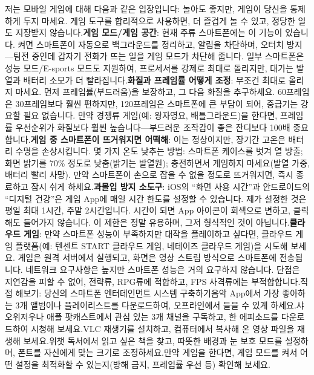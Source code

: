 저는 모바일 게임에 대해 다음과 같은 입장입니다: 놀아도 좋지만, 게임이 당신을 통제하게 두지 마세요. 게임 도구를 합리적으로 사용하면, 더 즐겁게 놀 수 있고, 정당한 일도 지장받지 않습니다.\textbf{게임 모드/게임 공간}: 현재 주류 스마트폰에는 이 기능이 있습니다. 켜면 스마트폰이 자동으로 백그라운드를 정리하고, 알림을 차단하며, 오터치 방지—팀전 중인데 갑자기 전화가 뜨는 일을 게임 모드가 차단해 줍니다. 일부 스마트폰은 성능 모드/E-sports 모드도 지원하여, 프로세서를 강제로 최대로 돌리지만, 대가는 발열과 배터리 소모가 더 빨라집니다.\textbf{화질과 프레임률 어떻게 조정}: 무조건 최대로 올리지 마세요. 먼저 프레임률(부드러움)을 보장하고, 그 다음 화질을 추구하세요. 60프레임은 30프레임보다 훨씬 편하지만, 120프레임은 스마트폰에 큰 부담이 되어, 중급기는 강요할 필요 없습니다. 만약 경쟁류 게임(예: 왕자영요, 배틀그라운드)을 한다면, 프레임률 우선순위가 화질보다 훨씬 높습니다—부드러운 조작감이 좋은 잔디보다 100배 중요합니다.\textbf{게임 중 스마트폰이 뜨거워지면 어떡해}: 이는 정상이지만, 장기간 고온은 배터리 수명을 손상시킵니다. 몇 가지 온도 낮추는 방법: 스마트폰 케이스를 벗겨 열 방출; 화면 밝기를 70\% 정도로 낮춤(밝기는 발열원); 충전하면서 게임하지 마세요(발열 가중, 배터리 빨리 사망). 만약 스마트폰이 손으로 잡을 수 없을 정도로 뜨거워지면, 즉시 종료하고 잠시 쉬게 하세요.\textbf{과몰입 방지 소도구}: iOS의 “화면 사용 시간”과 안드로이드의 “디지털 건강”은 게임 App에 매일 시간 한도를 설정할 수 있습니다. 제가 설정한 것은 평일 최대 1시간, 주말 2시간입니다. 시간이 되면 App 아이콘이 회색으로 변하고, 클릭해도 들어가지 않습니다. 이 제한은 정말 유용하며, 그저 형식적인 것이 아닙니다.\textbf{클라우드 게임}: 만약 스마트폰 성능이 부족하지만 대작을 플레이하고 싶다면, 클라우드 게임 플랫폼(예: 텐센트 START 클라우드 게임, 네테이즈 클라우드 게임)을 시도해 보세요. 게임은 원격 서버에서 실행되고, 화면은 영상 스트림 방식으로 스마트폰에 전송됩니다. 네트워크 요구사항은 높지만 스마트폰 성능은 거의 요구하지 않습니다. 단점은 지연감을 피할 수 없어, 전략류, RPG류에 적합하고, FPS 사격류에는 부적합합니다.직접 해보기: 당신의 스마트폰 엔터테인먼트 시스템 구축하기음악 App에서 가장 좋아하는 3개 앨범이나 플레이리스트를 다운로드하여, 오프라인에서 들을 수 있게 하세요.샤오위저우나 애플 팟캐스트에서 관심 있는 3개 채널을 구독하고, 한 에피소드를 다운로드하여 시청해 보세요.VLC 재생기를 설치하고, 컴퓨터에서 복사해 온 영상 파일을 재생해 보세요.위챗 독서에서 읽고 싶은 책을 찾고, 따뜻한 배경과 눈 보호 모드를 설정하며, 폰트를 자신에게 맞는 크기로 조정하세요.만약 게임을 한다면, 게임 모드를 켜서 어떤 설정을 최적화할 수 있는지(방해 금지, 프레임률 우선 등) 확인해 보세요.
